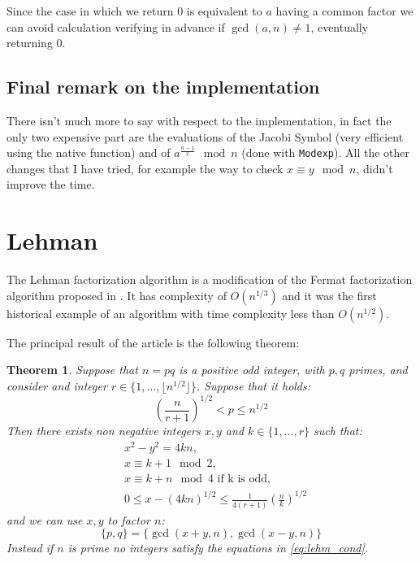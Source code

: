 \documentclass{article}
\theoremstyle{plain}
\newtheorem{teo}{Theorem}[section]
\theoremstyle{remark}
\theoremstyle{definition}
\begin{document}
Since the case in which we return $0$ is equivalent to $a$ having a common factor we can avoid calculation verifying in advance if $\gcd(a,n) \neq 1$, eventually returning $0$. 

\subsection{Final remark on the implementation}

There isn't much more to say with respect to the implementation, in fact the only two expensive part are the evaluations of the Jacobi Symbol (very efficient using the native function) and of $a^{\frac{n-1}{2}} \mod n$ (done with \texttt{Modexp}). All the other changes that I have tried, for example the way to check $x\equiv y \mod n$, didn't improve the time.  



\section{Lehman}

The Lehman factorization algorithm is a modification of the Fermat factorization algorithm proposed in \cite{lehman}. It has complexity of $O(n^{1/3})$ and it was the first historical example of an algorithm with time complexity less than $O(n^{1/2})$. 

The principal result of the article is the following theorem:

\begin{teo} \label{teo:lehm}
	Suppose that $n = pq$ is a positive odd integer, with $p,q$ primes, and consider and integer $r \in \{ 1,...,\lfloor n^{1/2}\rfloor\}$. Suppose that it holds:
	\begin{equation}
		\label{eq:p_cond}
		\left( \frac{n}{r+1}\right)^{1/2} < p \leq n^{1/2}
	\end{equation}
	Then there exists non negative integers $x,y$ and $k \in \{1,...,r\}$ such that:
	\begin{subequations} \label{eq:lehm_cond}
		\begin{align}
			&x^2 - y^2 = 4kn, \label{eq:lehm_cond_xy}\\
			&x \equiv k + 1 \mod 2, \label{eq:lehm_cond_1} \\
			&x \equiv k + n \mod 4 \text{ if k is odd},\label{eq:lehm_cond_2} \\
			&0 \leq x - (4kn)^{1/2} \leq \frac{1}{4(r+1)} \left(\frac{n}{k}\right)^{1/2} \label{eq:lehm_cond_it}
		\end{align}
	\end{subequations}
	and we can use $x,y$ to factor $n$:
	\begin{equation}
		\label{eq:lehm_fact}
		\{p,q\} = \{\gcd(x+y,n), \gcd(x-y,n)\}
	\end{equation}
	Instead if $n$ is prime no integers satisfy the equations in \ref{eq:lehm_cond}.
\end{teo}
\end{document}
